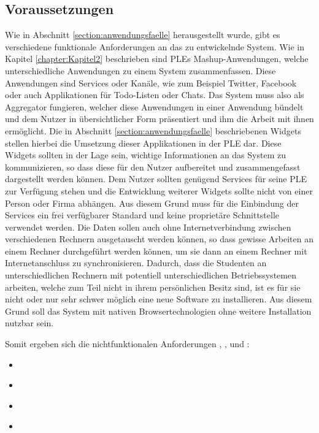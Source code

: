 \subsection{Voraussetzungen}
Wie in Abschnitt \ref{section:anwendungsfaelle} herausgestellt wurde, gibt es verschiedene funktionale Anforderungen an das zu entwickelnde System. Wie in Kapitel \ref{chapter:Kapitel2} beschrieben sind \acp{PLE} Mashup-Anwendungen, welche unterschiedliche Anwendungen zu einem System zusammenfassen. Diese Anwendungen sind Services oder Kanäle, wie zum Beispiel Twitter, Facebook oder auch Applikationen für Todo-Listen oder Chats. Das System muss also als Aggregator fungieren, welcher diese Anwendungen in einer Anwendung bündelt und dem Nutzer in übersichtlicher Form präsentiert und ihm die Arbeit mit ihnen ermöglicht. Die in Abschnitt \ref{section:anwendungsfaelle} beschriebenen Widgets stellen hierbei die Umsetzung dieser Applikationen in der \ac{PLE} dar. Diese Widgets sollten in der Lage sein, wichtige Informationen an das System zu kommunizieren, so dass diese für den Nutzer aufbereitet und zusammengefasst dargestellt werden können. Dem Nutzer sollten genügend Services für seine \ac{PLE} zur Verfügung stehen und die Entwicklung weiterer Widgets sollte nicht von einer Person oder Firma abhängen. Aus diesem Grund muss für die Einbindung der Services ein frei verfügbarer Standard und keine proprietäre Schnittstelle verwendet werden. Die Daten sollen auch ohne Internetverbindung zwischen verschiedenen Rechnern ausgetauscht werden können, so dass gewisse Arbeiten an einem Rechner durchgeführt werden können, um sie dann an einem Rechner mit Internetanschluss zu synchronisieren. Dadurch, dass die Studenten an unterschiedlichen Rechnern mit potentiell unterschiedlichen Betriebssystemen arbeiten, welche zum Teil nicht in ihrem persönlichen Besitz sind, ist es für sie nicht oder nur sehr schwer möglich eine neue Software zu installieren. Aus diesem Grund soll das System mit nativen Browsertechnologien ohne weitere Installation nutzbar sein.

Somit ergeben sich die nichtfunktionalen Anforderungen , ,  und : 
\begin{itemize}
 \item \requirementnf{\requirementAggregator}\label{requirementAggregator}
 \item \requirementnf{\requirementWidgetStandard}\label{requirementWidgetStandard}
 \item \requirementnf{\requirementUsbStick}\label{requirementUsbStick}
 \item \requirementnf{\requirementUsageInBrowser}\label{requirementUsageInBrowser}
\end{itemize}

